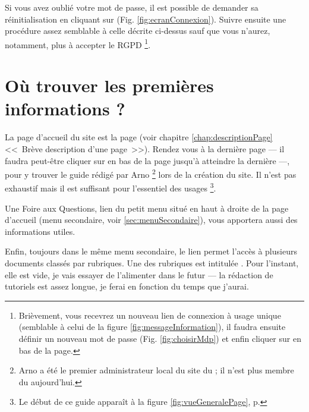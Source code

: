 
\label{sec:mdpOublie}
Si vous avez oublié votre mot de passe, il est possible de demander sa réinitialisation en cliquant sur  (Fig. \ref{fig:ecranConnexion}). Suivre ensuite une procédure assez semblable à celle décrite ci-dessus sauf que vous n’aurez, notamment, plus à accepter le RGPD%
\footnote{Brièvement, vous recevrez un nouveau lien de connexion à usage unique (semblable à celui de la figure \ref{fig:messageInformation}), il faudra ensuite définir un nouveau mot de passe (Fig. \ref{fig:choisirMdp}) et enfin cliquer sur  en bas de la page.}.


\section{Où trouver les premières informations ?}\label{page:premieresInfos}

La page d’accueil du site est la page  (voir chapitre \ref{chap:descriptionPage} <<~Brève description d’une page~>>). Rendez vous à la dernière page --- il faudra peut-être cliquer sur   en bas de la page jusqu’à atteindre la dernière ---, pour y trouver le guide rédigé par Arno%
\footnote{Arno a été le premier administrateur local du site du \CdS; il n'est plus membre du \sel{} aujourd'hui.} 
lors de la création du site. Il n'est pas exhaustif mais il est suffisant pour l’essentiel des usages%
\footnote{Le début de ce guide apparaît à la figure \ref{fig:vueGeneralePage}, p. \pageref{fig:vueGeneralePage}}.

Une Foire aux Questions, lien  du petit menu situé en haut à droite de la page d’accueil (menu secondaire, voir \vref{sec:menuSecondaire}), vous apportera aussi des informations utiles. 

Enfin, toujours dans le même menu secondaire, le lien  permet l’accès à plusieurs documents classés par rubriques. Une  des rubriques est intitulée . Pour l’instant, elle est vide, je vais essayer de l’alimenter dans le futur --- la rédaction de tutoriels est assez longue, je ferai en fonction du temps que j'aurai.
